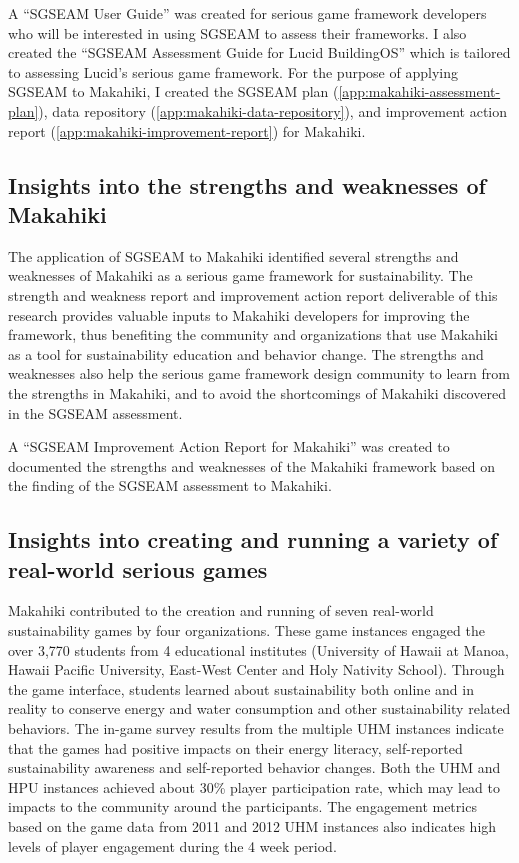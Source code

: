 A ``SGSEAM User Guide'' \cite{csdl2-13-06} was created for serious game framework developers who will be interested in using SGSEAM to assess their frameworks. I also created the ``SGSEAM Assessment Guide for Lucid BuildingOS'' \cite{csdl2-13-07} which is tailored to assessing Lucid's serious game framework.
For the purpose of applying SGSEAM to Makahiki, I created the SGSEAM plan (\autoref{app:makahiki-assessment-plan}), data repository (\autoref{app:makahiki-data-repository}), and improvement action report (\autoref{app:makahiki-improvement-report}) for Makahiki.

\subsection{Insights into the strengths and weaknesses of Makahiki}

The application of SGSEAM to Makahiki identified several strengths and weaknesses of  Makahiki as a serious game framework for sustainability. The strength and weakness report and improvement action report deliverable of this research provides valuable inputs to Makahiki developers for improving the framework, thus benefiting the community and organizations that use Makahiki as a tool for sustainability education and behavior change. The strengths and weaknesses also help the serious game framework design community to learn from the strengths in Makahiki, and to avoid the shortcomings of Makahiki discovered in the SGSEAM assessment. 

A ``SGSEAM Improvement Action Report for Makahiki'' \cite{csdl2-14-12} was created to documented the strengths and weaknesses of the Makahiki framework based on the finding of the SGSEAM assessment to Makahiki.

\subsection{Insights into creating and running a variety of real-world serious games}

Makahiki contributed to the creation and running of seven real-world sustainability games by four  organizations. These game instances engaged the over 3,770 students from 4 educational institutes (University of Hawaii at Manoa, Hawaii Pacific University, East-West Center and Holy Nativity School). Through the game interface, students learned about sustainability both online and in reality to conserve energy and water consumption and other sustainability related behaviors. The in-game survey results from the multiple UHM instances indicate that the games had positive impacts on their energy literacy, self-reported sustainability awareness and self-reported behavior changes. Both the UHM and HPU instances achieved about 30\% player participation rate, which may lead to impacts to the community around the participants. The engagement metrics based on the game data from 2011 and 2012 UHM instances also indicates high levels of player engagement during the 4 week period.

